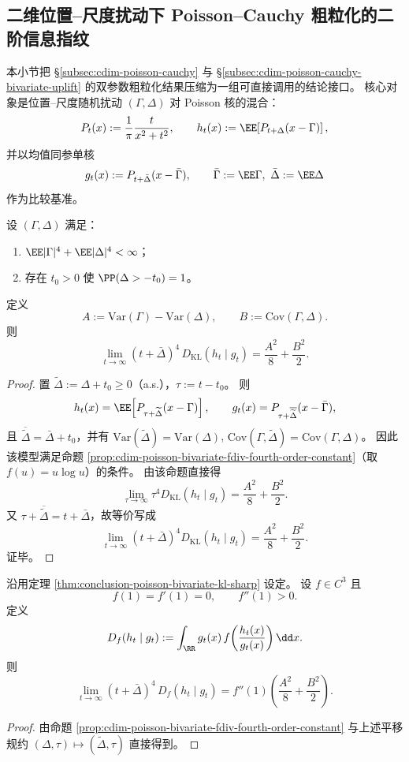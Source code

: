 \subsection{二维位置--尺度扰动下 Poisson--Cauchy 粗粒化的二阶信息指纹}\label{subsec:conclusion-poisson-cauchy-bivariate-information-fingerprint}
本小节把 \S\ref{subsec:cdim-poisson-cauchy} 与 \S\ref{subsec:cdim-poisson-cauchy-bivariate-uplift} 的双参数粗粒化结果压缩为一组可直接调用的结论接口。
核心对象是位置--尺度随机扰动 \((\Gamma,\Delta)\) 对 Poisson 核的混合：
\[
P_t(x):=\frac{1}{\pi}\frac{t}{x^2+t^2},\qquad
h_t(x):=\EE\!\left[P_{t+\Delta}(x-\Gamma)\right],
\]
并以均值同参单核
\[
g_t(x):=P_{t+\bar\Delta}(x-\bar\Gamma),\qquad
\bar\Gamma:=\EE\Gamma,\ \bar\Delta:=\EE\Delta
\]
作为比较基准。

\begin{theorem}\label{thm:conclusion-poisson-bivariate-kl-sharp}
设 \((\Gamma,\Delta)\) 满足：
\begin{enumerate}
  \item \(\EE|\Gamma|^4+\EE|\Delta|^4<\infty\)；
  \item 存在 \(t_0>0\) 使 \(\PP(\Delta>-t_0)=1\)。
\end{enumerate}
定义
\[
A:=\mathrm{Var}(\Gamma)-\mathrm{Var}(\Delta),\qquad
B:=\mathrm{Cov}(\Gamma,\Delta).
\]
则
\[
\lim_{t\to\infty}(t+\bar\Delta)^4\,D_{\mathrm{KL}}(h_t\mid g_t)
=\frac{A^2}{8}+\frac{B^2}{2}.
\]
\end{theorem}
\begin{proof}
置 \(\widetilde\Delta:=\Delta+t_0\ge 0\)（a.s.），\(\tau:=t-t_0\)。
则
\[
h_t(x)=\EE\!\left[P_{\tau+\widetilde\Delta}(x-\Gamma)\right],\qquad
g_t(x)=P_{\tau+\overline{\widetilde\Delta}}(x-\bar\Gamma),
\]
且
\(
\overline{\widetilde\Delta}=\bar\Delta+t_0
\)，并有
\(
\mathrm{Var}(\widetilde\Delta)=\mathrm{Var}(\Delta)
\),
\(
\mathrm{Cov}(\Gamma,\widetilde\Delta)=\mathrm{Cov}(\Gamma,\Delta)
\)。
因此该模型满足命题 \ref{prop:cdim-poisson-bivariate-fdiv-fourth-order-constant}（取 \(f(u)=u\log u\)）的条件。
由该命题直接得
\[
\lim_{\tau\to\infty}\tau^4 D_{\mathrm{KL}}(h_t\mid g_t)
=\frac{A^2}{8}+\frac{B^2}{2}.
\]
又 \(\tau+\overline{\widetilde\Delta}=t+\bar\Delta\)，故等价写成
\[
\lim_{t\to\infty}(t+\bar\Delta)^4 D_{\mathrm{KL}}(h_t\mid g_t)
=\frac{A^2}{8}+\frac{B^2}{2}.
\]
证毕。
\end{proof}

\begin{corollary}\label{cor:conclusion-poisson-bivariate-fdiv-sharp}
沿用定理 \ref{thm:conclusion-poisson-bivariate-kl-sharp} 设定。
设 \(f\in C^3\) 且
\[
f(1)=f'(1)=0,\qquad f''(1)>0.
\]
定义
\[
D_f(h_t\mid g_t):=\int_{\RR} g_t(x)\,f\!\left(\frac{h_t(x)}{g_t(x)}\right)\dd x.
\]
则
\[
\lim_{t\to\infty}(t+\bar\Delta)^4\,D_f(h_t\mid g_t)
=f''(1)\left(\frac{A^2}{8}+\frac{B^2}{2}\right).
\]
\end{corollary}
\begin{proof}
由命题 \ref{prop:cdim-poisson-bivariate-fdiv-fourth-order-constant} 与上述平移规约 \((\Delta,\tau)\mapsto(\widetilde\Delta,\tau)\) 直接得到。
\end{proof}

